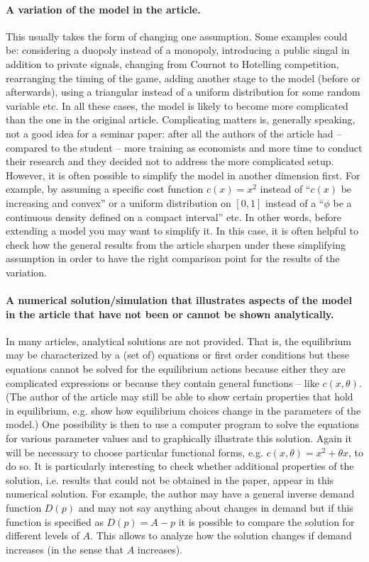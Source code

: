 \documentclass[a4paper,11pt]{article}
\begin{document}
\paragraph{A variation of the model in the article.} This usually takes the form of changing one assumption. Some examples could be: considering a duopoly instead of a monopoly, introducing a public singal in addition to private signals, changing from Cournot to Hotelling competition, rearranging the timing of the game, adding another stage to the model (before or afterwards), using a triangular instead of a uniform distribution for some random variable etc. In all these cases, the model is likely to become more complicated than the one in the original article. Complicating matters is, generally speaking, not a good idea for a seminar paper: after all the authors of the article had -- compared to the student -- more training as economists and more time to conduct their research and they decided not to address the more complicated setup. However, it is often possible to simplify the model in another dimension first. For example, by assuming a specific cost function $c(x)=x^2$ instead of ``$c(x)$ be increasing and convex'' or a uniform distribution on $[0,1]$ instead of a ``$\phi$ be a continuous density defined on a compact interval'' etc. In other words, before extending a model you may want to simplify it. In this case, it is often helpful to check how the general results from the article sharpen under these simplifying assumption in order to have the right comparison point for the results of the variation.

\paragraph{A numerical solution/simulation that illustrates aspects of the model in the article that have not been or cannot be shown analytically.} In many articles, analytical solutions are not provided. That is, the equilibrium may be characterized by a (set of) equations or first order conditions but these equations cannot be solved for the equilibrium actions because either they are complicated expressions or because they contain general functions -- like $c(x,\theta)$. (The author of the article may still be able to show certain properties that hold in equilibrium, e.g. show how equilibrium choices change in the parameters of the model.) One possibility is then to use a computer program to solve the equations for various parameter values and to graphically illustrate this solution. Again it will be necessary to choose particular functional forms, e.g. $c(x,\theta)=x^2+\theta x$, to do so. It is particularly interesting to check whether additional properties of the solution, i.e. results that could not be obtained in the paper, appear in this numerical solution. For example, the author may have a general inverse demand function $D(p)$ and may not say anything about changes in demand but if this function is specified as $D(p)=A-p$ it is possible to compare the solution for different levels of $A$. This allows to analyze how the solution changes if demand increases (in the sense that $A$ increases).
\end{document}

